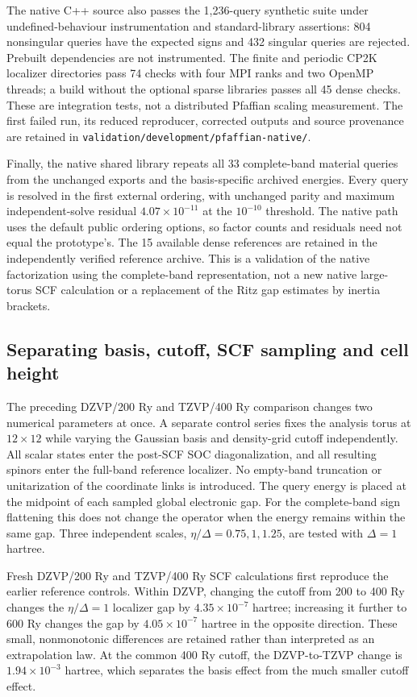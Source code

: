 \documentclass[11pt]{article}
\begin{document}
The native C++ source also passes the 1,236-query synthetic suite under
undefined-behaviour instrumentation and standard-library assertions:
804 nonsingular queries have the expected signs and 432 singular queries
are rejected. Prebuilt dependencies are not instrumented. The finite
and periodic CP2K localizer directories pass 74 checks with four MPI
ranks and two OpenMP threads; a build without the optional sparse
libraries passes all 45 dense checks. These are integration tests, not
a distributed Pfaffian scaling measurement. The first failed run,
its reduced reproducer, corrected outputs and source provenance are
retained in \nolinkurl{validation/development/pfaffian-native/}.

Finally, the native shared library repeats all 33 complete-band material
queries from the unchanged exports and the basis-specific archived
energies. Every query is resolved in the first external ordering,
with unchanged parity and maximum independent-solve residual
$4.07\times10^{-11}$ at the $10^{-10}$ threshold. The native path uses
the default public ordering options, so factor counts and residuals
need not equal the prototype's. The 15 available dense references
are retained in the independently verified reference archive.
This is a validation of the native factorization using the complete-band
representation, not a new native large-torus SCF calculation or
a replacement of the Ritz gap estimates by inertia brackets.

\subsection{Separating basis, cutoff, SCF sampling and cell height}
\label{sec:si-stanene-separated}
The preceding DZVP/200 Ry and TZVP/400 Ry comparison changes two
numerical parameters at once. A separate control series fixes the
analysis torus at $12\times12$ while varying the Gaussian basis and
density-grid cutoff independently. All scalar states enter the
post-SCF SOC diagonalization, and all resulting spinors enter the
full-band reference localizer. No empty-band truncation or
unitarization of the coordinate links is introduced.
The query energy is placed at the midpoint of each sampled global
electronic gap. For the complete-band sign flattening this does not
change the operator when the energy remains within the same gap.
Three independent scales, $\eta/\Delta=0.75,1,1.25$, are tested with
$\Delta=1$ hartree.

Fresh DZVP/200 Ry and TZVP/400 Ry SCF calculations first reproduce
the earlier reference controls. Within DZVP, changing the cutoff
from 200 to 400 Ry changes the $\eta/\Delta=1$ localizer gap by
$4.35\times10^{-7}$ hartree; increasing it further to 600 Ry changes
the gap by $4.05\times10^{-7}$ hartree in the opposite direction.
These small, nonmonotonic differences are retained rather than
interpreted as an extrapolation law. At the common 400 Ry cutoff,
the DZVP-to-TZVP change is $1.94\times10^{-3}$ hartree, which
separates the basis effect from the much smaller cutoff effect.
\end{document}
